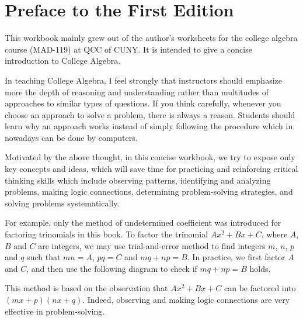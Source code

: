 
\chapter*{Preface to the First Edition}

This workbook mainly grew out of the author's worksheets for the college algebra course (MAD-119) at QCC of CUNY.
It is intended to give a concise introduction to College Algebra.
  

In teaching College Algebra, I feel strongly that instructors should emphasize more the depth of reasoning and understanding rather than multitudes of approaches to similar types of questions. If you think carefully, whenever you choose an approach to solve a  problem, there is always a reason. Students should learn why an approach works instead of simply following the procedure which in nowadays can be done by computers. 

Motivated by the above thought, in this concise workbook, we try to expose only key concepts and ideas, which will save time for practicing and
reinforcing critical thinking skills which include observing patterns, identifying and analyzing problems, making logic connections, determining problem-solving strategies, and solving problems systematically.

For example, only the method of undetermined coefficient was introduced for factoring trinomials in this book. To factor the trinomial $Ax^2+Bx+C$, where $A$, $B$ and $C$ are integers, we may use trial-and-error method to find integers $m$, $n$, $p$ and $q$ such that $mn=A$, $pq=C$ and $mq+np=B$.
In practice, we first factor $A$ and $C$, and then use the following diagram to check if $mq+np=B$ holds.
\begin{center}
\end{center}
This method is based on the observation that $Ax^2+Bx+C$ can be factored into $(mx+p)(nx+q)$.
Indeed, observing and making logic connections are very effective in problem-solving.


